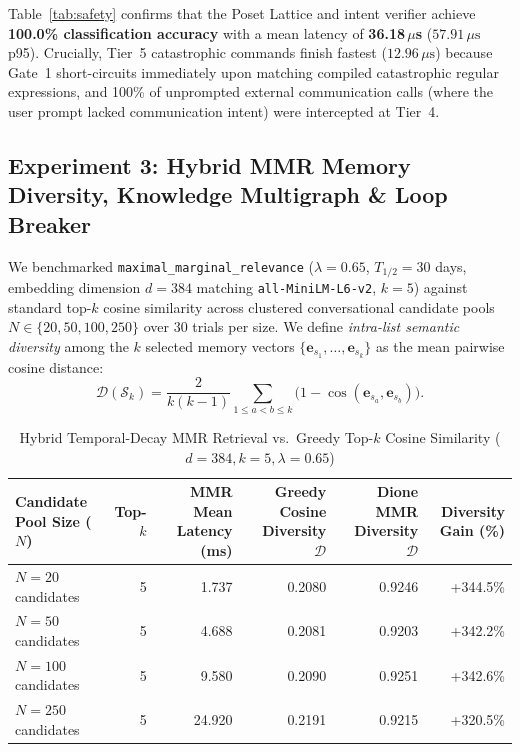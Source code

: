 \documentclass[10pt,a4paper]{article}
\begin{document}
Table~\ref{tab:safety} confirms that the Poset Lattice and intent verifier achieve \textbf{100.0\% classification accuracy} with a mean latency of \textbf{36.18\,$\mu$s} ($57.91\,\mu\text{s}$ p95). Crucially, Tier~5 catastrophic commands finish fastest ($12.96\,\mu\text{s}$) because Gate~1 short-circuits immediately upon matching compiled catastrophic regular expressions, and 100\% of unprompted external communication calls (where the user prompt lacked communication intent) were intercepted at Tier~4.

\subsection{Experiment 3: Hybrid MMR Memory Diversity, Knowledge Multigraph \& Loop Breaker}
We benchmarked \texttt{maximal\_marginal\_relevance} ($\lambda = 0.65$, $T_{1/2} = 30$ days, embedding dimension $d = 384$ matching \texttt{all-MiniLM-L6-v2}, $k = 5$) against standard top-$k$ cosine similarity across clustered conversational candidate pools $N \in \{20, 50, 100, 250\}$ over 30 trials per size. We define \textit{intra-list semantic diversity} among the $k$ selected memory vectors $\{\mathbf{e}_{s_1}, \dots, \mathbf{e}_{s_k}\}$ as the mean pairwise cosine distance:
\begin{equation}
\mathcal{D}(\mathcal{S}_k) = \frac{2}{k(k-1)} \sum_{1 \le a < b \le k} \big(1 - \cos(\mathbf{e}_{s_a}, \mathbf{e}_{s_b})\big).
\end{equation}

\begin{table}[htbp]
\centering
\caption{Hybrid Temporal-Decay MMR Retrieval vs.\ Greedy Top-$k$ Cosine Similarity ($d=384, k=5, \lambda=0.65$)}
\label{tab:mmr}
\small
\begin{tabularx}{\textwidth}{Xrrrrr}
\toprule
\textbf{Candidate Pool Size ($N$)} & \textbf{Top-$k$} & \textbf{MMR Mean Latency (ms)} & \textbf{Greedy Cosine Diversity $\mathcal{D}$} & \textbf{Dione MMR Diversity $\mathcal{D}$} & \textbf{Diversity Gain (\%)} \\
\midrule
$N = 20$ candidates  & 5 & 1.737 & 0.2080 & 0.9246 & +344.5\% \\
$N = 50$ candidates  & 5 & 4.688 & 0.2081 & 0.9203 & +342.2\% \\
$N = 100$ candidates & 5 & 9.580 & 0.2090 & 0.9251 & +342.6\% \\
$N = 250$ candidates & 5 & 24.920 & 0.2191 & 0.9215 & +320.5\% \\
\bottomrule
\end{tabularx}
\end{table}
\end{document}
